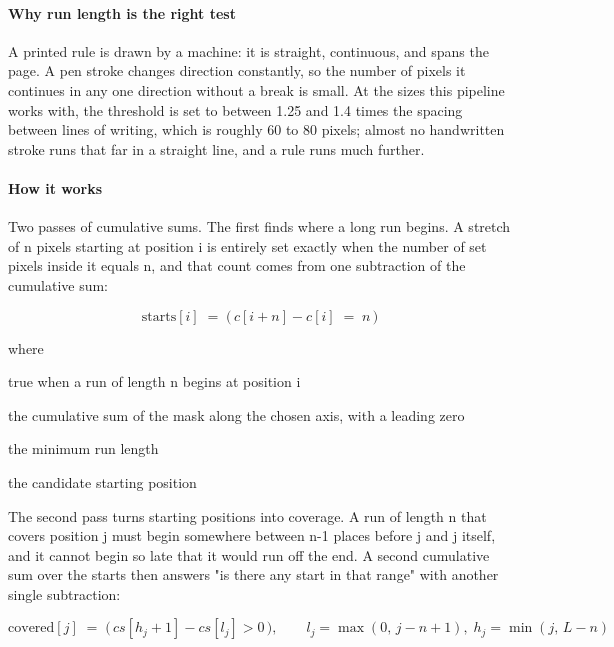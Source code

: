 \paragraph{Why run length is the right test}
A printed rule is drawn by a machine: it is straight, continuous, and spans the page. A pen stroke changes direction constantly, so the number of pixels it continues in any one direction without a break is small. At the sizes this pipeline works with, the threshold is set to between 1.25 and 1.4 times the spacing between lines of writing, which is roughly 60 to 80 pixels; almost no handwritten stroke runs that far in a straight line, and a rule runs much further.


\paragraph{How it works}
Two passes of cumulative sums. The first finds where a long run begins. A stretch of n pixels starting at position i is entirely set exactly when the number of set pixels inside it equals n, and that count comes from one subtraction of the cumulative sum:


\begin{equation}
\mathrm{starts}[i] \;=\; \big(\, c[i+n] - c[i] \;=\; n \,\big)
\end{equation}

\noindent where
\begin{description}[leftmargin=2.4em,style=nextline,font=\normalfont\ttfamily]\setlength\itemsep{1pt}
  \item[{$\mathrm{starts}[i]$}] \normalfont true when a run of length n begins at position i
  \item[{$c$}] \normalfont the cumulative sum of the mask along the chosen axis, with a leading zero
  \item[{$n$}] \normalfont the minimum run length
  \item[{$i$}] \normalfont the candidate starting position
\end{description}
The second pass turns starting positions into coverage. A run of length n that covers position j must begin somewhere between n-1 places before j and j itself, and it cannot begin so late that it would run off the end. A second cumulative sum over the starts then answers "is there any start in that range" with another single subtraction:


\begin{equation}
\mathrm{covered}[j] \;=\; \big(\, cs[h_j+1] - cs[l_j] > 0 \,\big), \qquad l_j = \max(0,\,j-n+1),\; h_j = \min(j,\,L-n)
\end{equation}

